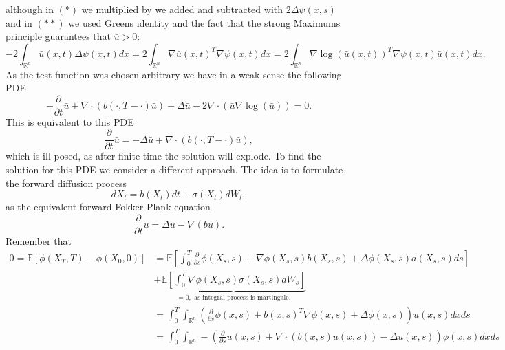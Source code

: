 \documentclass[a4paper,12pt,twoside]{article}
\begin{document}
although in $(*)$ we multiplied by we added and subtracted with $2 \Delta \psi (x,s)$ and in $(**)$ we used Greens identity and the fact that the strong Maximums principle guarantees that $\bar{u}>0$: 
\[
-2 \int_{\mathbb{R}^n} \bar{u}(x,t) \Delta \psi (x,t)dx = 2 \int_{\mathbb{R}^n} \nabla \bar{u}(x,t)^T \nabla \psi (x,t) dx = 2 \int_{\mathbb{R}^n} \nabla \log (\bar{u}(x,t))^T \nabla \psi (x,t) \bar{u}(x,t) dx .
\]
As the test function was chosen arbitrary we have in a weak sense the following PDE 
\[
-\frac{\partial}{\partial t} \bar{u} + \nabla \cdot ( b(\cdot,T-\cdot) \bar{u} ) + \Delta \bar{u} - 2 \nabla \cdot ( \bar{u} \nabla \log (\bar{u}))=0.
\]
This is equivalent to this PDE 
\[
\frac{\partial}{\partial t} \bar{u} = - \Delta \bar{u} + \nabla \cdot ( b(\cdot,T-\cdot) \bar{u} ),
\]
which is ill-posed, as after finite time the solution will explode. To find the solution for this PDE we consider a different approach. The idea is to formulate the forward diffusion process 
\[
dX_t = b(X_t) dt + \sigma (X_t) d W_t,
\] 
as the equivalent forward Fokker-Plank equation 
\[
\frac{\partial}{\partial t} u = \Delta u - \nabla (b u).
\]
Remember that 
\begin{align*}
    0= \mathbb{E}[ \phi(X_T,T)- \phi(X_0,0) ]&= \mathbb{E}[ \int_0^T \frac{\partial}{\partial s} \phi (X_s,s)+\nabla \phi (X_s,s) b(X_s,s) + \Delta \phi (X_s,s) a(X_s,s)ds  ] \\
    &+ \underbrace{\mathbb{E}[ \int_0^T \nabla \phi (X_s,s) \sigma(X_s,s)d W_s ]}_{=0, \text{ as integral process is martingale}.}\\
    &= \int_0^T \int_{\mathbb{R}^n} \left( \frac{\partial}{\partial s} \phi (x,s) + b(x,s)^T \nabla \phi (x,s) + \Delta \phi (x,s) \right) u(x,s) dx ds \\
    &= \int_0^T \int_{\mathbb{R}^n} - \left( \frac{\partial}{\partial s} u (x,s) +  \nabla \cdot (b(x,s) u (x,s)) - \Delta u (x,s) \right) \phi (x,s) dx ds \\
\end{align*}
\end{document}
